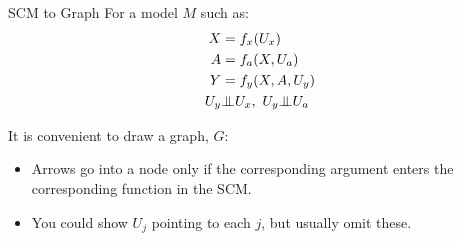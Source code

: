 \documentclass[xcolor=dvipsnames]{beamer}
\newcommand{\indep}{{\bot\negthickspace\negthickspace\bot}}
\begin{document}
\begin{frame}{SCM to Graph}
\small
For a model $M$ such as:
            \begin{align*}
                X &= f_{x}(U_x)\\
                A &= f_{a}(X, U_a)\\
                Y &= f_{y}(X, A, U_y)\\
                U_{y}&\indep U_{x},~ U_{y}\indep U_{a}
            \end{align*}
          
It is convenient to draw a graph, $G$:
\\
\begin{center}
 \end{center}
        \footnotesize
        \begin{itemize}
        \item<3->  Arrows go into a node only if the corresponding argument enters the corresponding function in the SCM.
        \item<4-> You could show $U_j$ pointing to each $j$, but usually omit these. 
        \end{itemize}
\end{frame}
\end{document}
